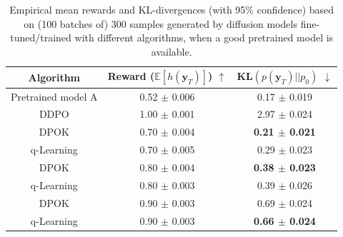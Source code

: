 \documentclass[11pt]{article}
\begin{document}
\begin{table}[h]
	\centering
	\begin{tabular}{c | c c }
		\hline Algorithm & Reward ($\mathbb{E}[h(\mathbf{y}_T)]$) $\uparrow$& KL$(p(\mathbf{y}_T) || p_0)$ $\downarrow$\\\hline
		Pretrained model A &  0.52 $\pm$ 0.006 & 0.17 $\pm$ 0.019  \\
		DDPO  & 1.00 $\pm$ 0.001  & 2.97 $\pm$ 0.024  \\\hline\hline
		DPOK &  0.70 $\pm$ 0.004 &  \textbf{0.21 $\pm$ 0.021} \\				
		q-Learning  & 0.70 $\pm$ 0.005 & 0.29 $\pm$ 0.023 \\ \hline
		DPOK  & 0.80 $\pm$ 0.004 & \textbf{0.38 $\pm$ 0.023}\\				
		q-Learning    & 0.80 $\pm$ 0.003 & 0.39 $\pm$ 0.026  \\\hline
		DPOK &  0.90 $\pm$ 0.003 &  0.69 $\pm$ 0.024 \\				
		q-Learning  & 0.90 $\pm$ 0.003 & \textbf{0.66 $\pm$ 0.024} \\ \hline
		
	\end{tabular}
	\caption{Empirical mean rewards and KL-divergences (with 95\% confidence) based on (100 batches of) 300 samples generated by diffusion models fine-tuned/trained with different algorithms, when a good pretrained model is available.}
	\label{table:pretrain_cmp_good}
\end{table}
\end{document}
